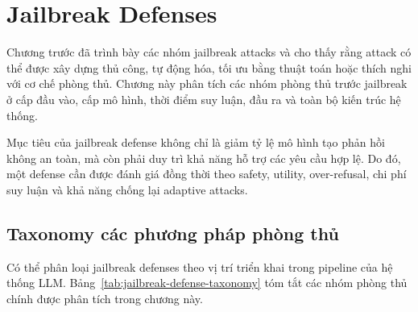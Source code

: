 \section{Jailbreak Defenses}
\label{sec:jailbreak-defenses}

Chương trước đã trình bày các nhóm jailbreak attacks và cho thấy rằng
attack có thể được xây dựng thủ công, tự động hóa, tối ưu bằng thuật toán
hoặc thích nghi với cơ chế phòng thủ. Chương này phân tích các nhóm
phòng thủ trước jailbreak ở cấp đầu vào, cấp mô hình, thời điểm suy luận,
đầu ra và toàn bộ kiến trúc hệ thống.

Mục tiêu của jailbreak defense không chỉ là giảm tỷ lệ mô hình tạo phản
hồi không an toàn, mà còn phải duy trì khả năng hỗ trợ các yêu cầu hợp lệ.
Do đó, một defense cần được đánh giá đồng thời theo safety, utility,
over-refusal, chi phí suy luận và khả năng chống lại adaptive attacks.

\subsection{Taxonomy các phương pháp phòng thủ}
\label{subsec:defense-taxonomy}

Có thể phân loại jailbreak defenses theo vị trí triển khai trong pipeline
của hệ thống LLM. Bảng~\ref{tab:jailbreak-defense-taxonomy} tóm tắt các
nhóm phòng thủ chính được phân tích trong chương này.

